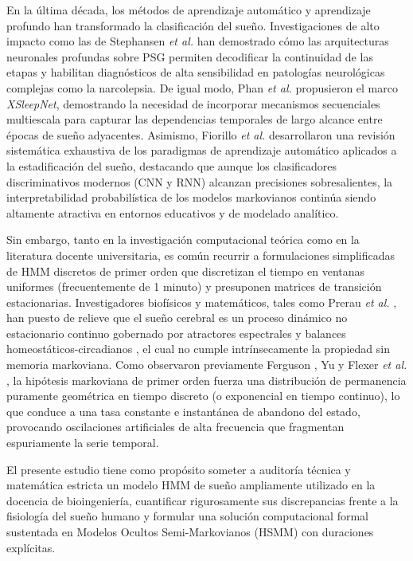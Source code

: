 \documentclass[11pt,a4paper]{article}
\begin{document}
En la última década, los métodos de aprendizaje automático y aprendizaje profundo han transformado la clasificación del sueño. Investigaciones de alto impacto como las de Stephansen \textit{et al.} \cite{stephansen2018} han demostrado cómo las arquitecturas neuronales profundas sobre PSG permiten decodificar la continuidad de las etapas y habilitan diagnósticos de alta sensibilidad en patologías neurológicas complejas como la narcolepsia. De igual modo, Phan \textit{et al.} \cite{phan2021} propusieron el marco \textit{XSleepNet}, demostrando la necesidad de incorporar mecanismos secuenciales multiescala para capturar las dependencias temporales de largo alcance entre épocas de sueño adyacentes. Asimismo, Fiorillo \textit{et al.} \cite{fiorillo2021} desarrollaron una revisión sistemática exhaustiva de los paradigmas de aprendizaje automático aplicados a la estadificación del sueño, destacando que aunque los clasificadores discriminativos modernos (CNN y RNN) alcanzan precisiones sobresalientes, la interpretabilidad probabilística de los modelos markovianos continúa siendo altamente atractiva en entornos educativos y de modelado analítico.

Sin embargo, tanto en la investigación computacional teórica como en la literatura docente universitaria, es común recurrir a formulaciones simplificadas de HMM discretos de primer orden que discretizan el tiempo en ventanas uniformes (frecuentemente de 1 minuto) y presuponen matrices de transición estacionarias. Investigadores biofísicos y matemáticos, tales como Prerau \textit{et al.} \cite{prerau2017}, han puesto de relieve que el sueño cerebral es un proceso dinámico no estacionario continuo gobernado por atractores espectrales y balances homeostáticos-circadianos \cite{borbely1982}, el cual no cumple intrínsecamente la propiedad sin memoria markoviana. Como observaron previamente Ferguson \cite{ferguson1980}, Yu \cite{yu2010} y Flexer \textit{et al.} \cite{flexer2005}, la hipótesis markoviana de primer orden fuerza una distribución de permanencia puramente geométrica en tiempo discreto (o exponencial en tiempo continuo), lo que conduce a una tasa constante e instantánea de abandono del estado, provocando oscilaciones artificiales de alta frecuencia que fragmentan espuriamente la serie temporal.

El presente estudio tiene como propósito someter a auditoría técnica y matemática estricta un modelo HMM de sueño ampliamente utilizado en la docencia de bioingeniería, cuantificar rigurosamente sus discrepancias frente a la fisiología del sueño humano y formular una solución computacional formal sustentada en Modelos Ocultos Semi-Markovianos (HSMM) con duraciones explícitas.
\end{document}
